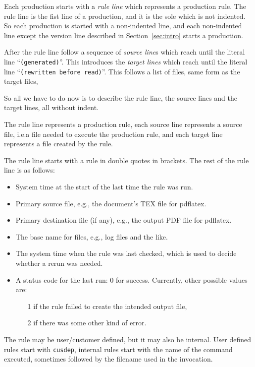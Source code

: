 \documentclass[a4paper, english]{article}%
\begin{document}
Each production starts with a \emph{rule line} which represents a production rule. 
The rule line is the fist line of a production, and it is the sole which is not indented.  
So each production is started with a non-indented line, 
and each non-indented line except the version line described in Section~\ref{sec:intro} starts a production. 

After the rule line follow a sequence of \emph{source line}s 
which reach until the literal line ``\texttt{(generated)}''. 
This introduces the \emph{target lines} 
which reach until the literal line ``\texttt{(rewritten before read)}''. 
This follows a list of files, same form as the target files, 

So all we have to do now is to describe the rule line, 
the source lines and the target lines, all without indent. 

The rule line represents a production rule, 
each source line represents a source file, 
i.e.\@ a file needed to execute the production rule, 
and each target line represents a file created by the rule. 

The rule line starts with a rule in double quotes in brackets. 
The rest of the rule line is as follows: 
%
\begin{itemize}
  \item 
  System time at the start of the last time the rule was run.
  \item 
  Primary source file, e.g., the document's TEX file for pdflatex.
  \item 
  Primary destination file (if any), e.g., the output PDF file for pdflatex.
  \item 
  The base name for files, e.g., log files and the like.
  \item 
  The system time when the rule was last checked, 
  which is used to decide whether a rerun was needed.
  \item
  A status code for the last run: 0 for success. 
  Currently, other possible values are: 
  \begin{enumerate}
    \item[1] if the rule failed to create the intended output file, 
    \item[2] if there was some other kind of error.
  \end{enumerate}
\end{itemize}

The rule may be user/customer defined, but it may also be internal. 
User defined rules start with \texttt{cusdep}, 
internal rules start with the name of the command executed, 
sometimes followed by the filename used in the invocation. 
\end{document}
